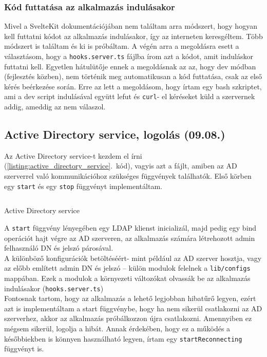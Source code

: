 \documentclass[a4paper]{article}
\newcommand{\inlts}[1]{\texttt{#1}}
\newcommand{\inltxt}[1]{\texttt{#1}}
\begin{document}
\subsubsection*{Kód futtatása az alkalmazás indulásakor}
Mivel a SvelteKit dokumentációjában nem találtam arra módszert, hogy hogyan kell futtatni kódot az
alkalmazás indulásakor, így az interneten keresgéltem. Több módszert is találtam és ki is próbáltam. A
végén arra a megoldásra esett a választásom, hogy a \inlts{hooks.server.ts} fájlba írom azt a kódot, amit
induláskor futtatni kell. Egyetlen hátulütője ennek a megoldásnak az az, hogy dev módban (fejlesztés
közben), nem történik meg automatikusan a kód futtatása, csak az első kérés beérkezése során. Erre
az lett a megoldásom, hogy írtam egy bash szkriptet, ami a dev script indulásával együtt lefut és \inltxt{curl}-
el kéréseket küld a szervernek addig, ameddig az nem válaszol.

\subsection{Active Directory service, logolás (09.08.)}

Az Active Directory service-t kezdem el írni (\ref{listing:active_directory_service}.~kód), vagyis azt a fájlt, amiben az AD szerverrel való
kommunikációhoz szükséges függvények találhatók. Első körben egy \inlts{start} és egy \inlts{stop} függvényt
implementáltam.

\begin{listing}[!ht]
\inputminted[bgcolor=codebg, breaklines, breakanywhere, fontsize=\small]{typescript}{code/activeDirectoryService.ts}
\caption{Active Directory service}
\label{listing:active_directory_service}
\end{listing}

A \inlts{start} függvény lényegében egy LDAP klienst inicializál, majd pedig egy bind operációt hajt végre az
AD szerveren, az alkalmazás számára létrehozott admin felhasználó DN és jelszó párosával.\\

A különböző konfigurációk betöltéséért- mint például az AD szerver hosztja, vagy az előbb említett
admin DN és jelszó – külön modulok felelnek a \inlts{lib/configs} mappában. Ezek a modulok a környezeti
változókat olvassák be az alkalmazás indulásakor (\inlts{hooks.server.ts}) \\

Fontosnak tartom, hogy az alkalmazás a lehető legjobban hibatűrő legyen, ezért azt is implementáltam
a start függvénybe, hogy ha nem sikerül csatlakozni az AD szerverhez, akkor az alkalmazás
próbálkozzon újra csatlakozni. Amennyiben ez mégsem sikerül, logolja a hibát. Annak érdekében, hogy
ez a működés a későbbiekben is könnyen használható legyen, írtam egy \inlts{startReconnecting}
függvényt is.
\end{document}
